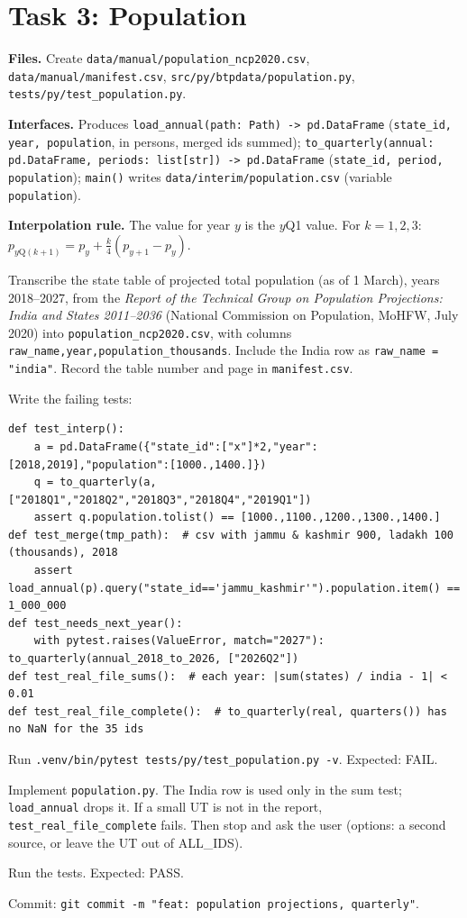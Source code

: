 \documentclass[10pt,a4paper]{article}
\newcommand{\f}[1]{\texttt{#1}}
\begin{document}
\section{Task 3: Population}
\textbf{Files.} Create \f{data/manual/population\_ncp2020.csv}, \f{data/manual/manifest.csv},
\f{src/py/btpdata/population.py}, \f{tests/py/test\_population.py}.

\textbf{Interfaces.} Produces \f{load\_annual(path: Path) -> pd.DataFrame} (\f{state\_id, year, population},
in persons, merged ids summed); \f{to\_quarterly(annual: pd.DataFrame, periods: list[str]) -> pd.DataFrame}
(\f{state\_id, period, population}); \f{main()} writes \f{data/interim/population.csv} (variable \f{population}).

\textbf{Interpolation rule.} The value for year $y$ is the $y$Q1 value. For $k = 1,2,3$:
$p_{y\mathrm{Q}(k+1)} = p_y + \tfrac{k}{4}(p_{y+1} - p_y)$.

\begin{steps}
\item Transcribe the state table of projected total population (as of 1 March), years 2018--2027, from the
      \emph{Report of the Technical Group on Population Projections: India and States 2011--2036} (National
      Commission on Population, MoHFW, July 2020) into \f{population\_ncp2020.csv}, with columns
      \f{raw\_name,year,population\_thousands}. Include the India row as \f{raw\_name = "india"}. Record the table
      number and page in \f{manifest.csv}.
\item Write the failing tests:
\begin{verbatim}
def test_interp():
    a = pd.DataFrame({"state_id":["x"]*2,"year":[2018,2019],"population":[1000.,1400.]})
    q = to_quarterly(a, ["2018Q1","2018Q2","2018Q3","2018Q4","2019Q1"])
    assert q.population.tolist() == [1000.,1100.,1200.,1300.,1400.]
def test_merge(tmp_path):  # csv with jammu & kashmir 900, ladakh 100 (thousands), 2018
    assert load_annual(p).query("state_id=='jammu_kashmir'").population.item() == 1_000_000
def test_needs_next_year():
    with pytest.raises(ValueError, match="2027"): to_quarterly(annual_2018_to_2026, ["2026Q2"])
def test_real_file_sums():  # each year: |sum(states) / india - 1| < 0.01
def test_real_file_complete():  # to_quarterly(real, quarters()) has no NaN for the 35 ids
\end{verbatim}
\item Run \f{.venv/bin/pytest tests/py/test\_population.py -v}. Expected: FAIL.
\item Implement \f{population.py}. The India row is used only in the sum test; \f{load\_annual} drops it.
      If a small UT is not in the report, \f{test\_real\_file\_complete} fails. Then stop and ask the user
      (options: a second source, or leave the UT out of ALL\_IDS).
\item Run the tests. Expected: PASS.
\item Commit: \f{git commit -m "feat: population projections, quarterly"}.
\end{steps}
\end{document}

